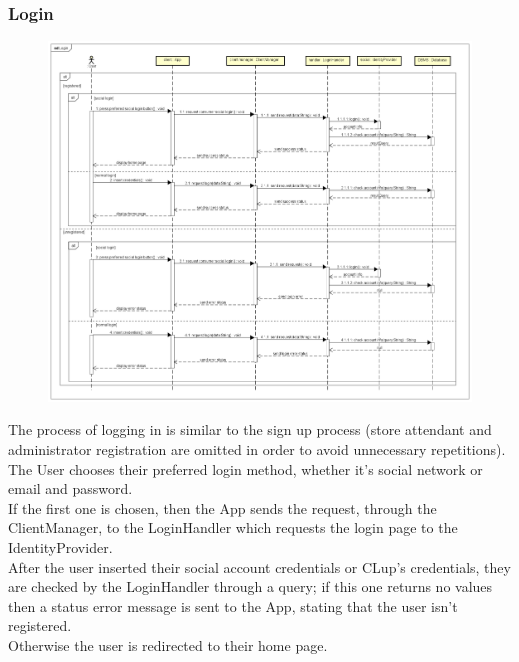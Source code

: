 \documentclass[table, 12pt]{article}
\begin{document}
\subsubsection{Login}
\begin{figure}[H]
    \begin{center}
        \includegraphics[width=\textwidth]{assets/Sequence-Diagram/login.png}
    \end{center}
\end{figure}
The process of logging in is similar to the sign up process (store attendant and administrator  registration are omitted in order to avoid unnecessary repetitions).\\
The User chooses their preferred login method, whether it's social network or email and password.\\
If the first one is chosen, then the App sends the request, through the ClientManager, to the LoginHandler which requests the login page to the IdentityProvider.\\
After the user inserted their social account credentials or CLup's credentials, they are checked by the LoginHandler through a query; if this one returns no values then a status error message is sent to the App, stating that the user isn't registered.\\
Otherwise the user is redirected to their home page.
\end{document}
